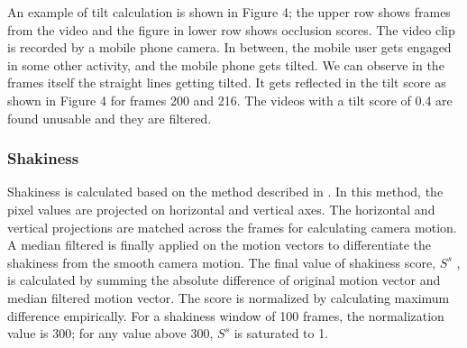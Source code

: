 \documentclass{new}
\begin{document}
An example of tilt calculation is shown in Figure 4; the upper
row shows frames from the video and the figure in lower row shows
occlusion scores. The video clip is recorded by a mobile phone
camera. In between, the mobile user gets engaged in some other
activity, and the mobile phone gets tilted. We can observe in the
frames itself the straight lines getting tilted. It gets reflected in the
tilt score as shown in Figure 4 for frames 200 and 216. The videos
with a tilt score of 0.4 are found unusable and they are filtered.

\subsubsection{Shakiness}
Shakiness is calculated based on the method described in \cite{4}.
In this method, the pixel values are projected on horizontal and
vertical axes. The horizontal and vertical projections are matched
across the frames for calculating camera motion. A median filtered
is finally applied on the motion vectors to differentiate the shakiness from the smooth camera motion. The final value of shakiness
score, $S^s$ , is calculated by summing the absolute difference of original motion vector and median filtered motion vector. The score is
normalized by calculating maximum difference empirically. For a
shakiness window of 100 frames, the normalization value is 300;
for any value above 300, $S^s$ is saturated to 1.
\end{document}
